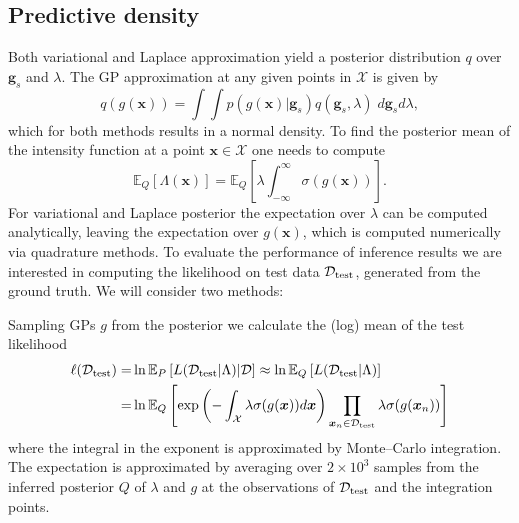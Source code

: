 \documentclass[twoside,11pt]{article}
\newcommand{\dataset}{{\cal D}}
\newcommand{\EE}[2]{\mathbb{E}_{#1}\left[ #2 \right]}
\newcommand{\bx}{\boldsymbol{x}}
\newcommand{\bg}{\boldsymbol{g}}
\newcommand{\X}{\mathcal{X}}
\begin{document}
\subsection{Predictive density} Both variational and Laplace approximation yield a posterior distribution $q$ over $\bg_s$ and $\lambda$. The GP approximation at any given points in $\X$ is given by
\begin{equation}
q(g(\bx)) = \int \int p(g(\bx) \vert \bg_s)q(\bg_s,\lambda)\;d\bg_s d\lambda,
\end{equation}
which for both methods results in a normal density. To find the posterior mean of the intensity function at a
point $\bx \in\X$ one needs to compute
\begin{equation}
\EE{Q}{\Lambda(\bx)} = \EE{Q}{\lambda \int_{-\infty}^{\infty} \sigma(g(\bx))}.
\end{equation}
For variational and Laplace posterior the expectation over $\lambda$ can be computed analytically, leaving the expectation over $g(\bx)$, which is computed numerically via quadrature methods. To evaluate the performance of inference results we are interested in computing the likelihood on test data $\dataset_{\rm test}$, generated from the ground truth. We will consider two methods:

Sampling GPs $g$ from the posterior we calculate the (log) mean of the test likelihood
\begin{equation}\label{eq:log predictive likelihood}
\begin{split}
\ell(\dataset_{\rm test}) = & \ln\EE{P}{L(\dataset_{\rm test}\vert \Lambda)\vert \dataset} \approx \ln\EE{Q}{ L(\dataset_{\rm test}\vert \Lambda)} 
\\ 
= & \ln\EE{Q}{\exp\left(-\int_{\X}\lambda\sigma(g(\bx))d\bx\right)\prod_{\bx_n\in\dataset_{\rm test}}\lambda\sigma(g(\bx_n))} 
\end{split}
\end{equation}
where the integral in the exponent is approximated by Monte--Carlo integration. The expectation is approximated by averaging over $2\times10^3$ samples from the inferred posterior $Q$ of $\lambda$ and $g$ at the observations of $\dataset_{\rm test}$ and the integration points.
\end{document}
